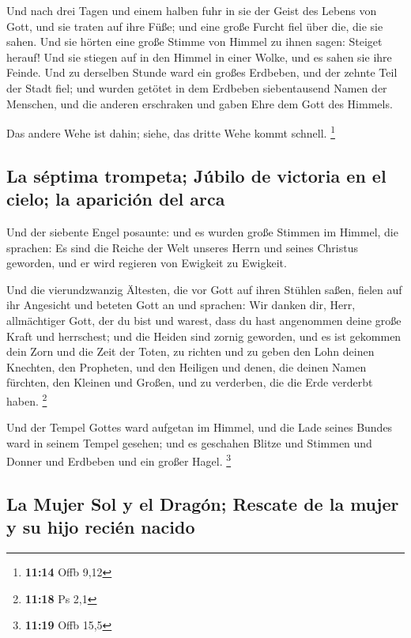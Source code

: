 Und nach drei Tagen und einem halben fuhr in sie der
Geist des Lebens von Gott, und sie traten auf ihre Füße; und eine große
Furcht fiel über die, die sie sahen.  Und sie hörten eine
große Stimme von Himmel zu ihnen sagen: Steiget herauf! Und sie stiegen
auf in den Himmel in einer Wolke, und es sahen sie ihre Feinde.
 Und zu derselben Stunde ward ein großes Erdbeben, und
der zehnte Teil der Stadt fiel; und wurden getötet in dem Erdbeben
siebentausend Namen der Menschen, und die anderen erschraken und gaben
Ehre dem Gott des Himmels.

 Das andere Wehe ist dahin; siehe, das dritte Wehe kommt
schnell. \footnote{\textbf{11:14} Offb 9,12}

\hypertarget{la-suxe9ptima-trompeta-juxfabilo-de-victoria-en-el-cielo-la-apariciuxf3n-del-arca}{%
\subsection{La séptima trompeta; Júbilo de victoria en el cielo; la
aparición del
arca}\label{la-suxe9ptima-trompeta-juxfabilo-de-victoria-en-el-cielo-la-apariciuxf3n-del-arca}}

 Und der siebente Engel posaunte: und es wurden große
Stimmen im Himmel, die sprachen: Es sind die Reiche der Welt unseres
Herrn und seines Christus geworden, und er wird regieren von Ewigkeit zu
Ewigkeit.

 Und die vierundzwanzig Ältesten, die vor Gott auf ihren
Stühlen saßen, fielen auf ihr Angesicht und beteten Gott an
 und sprachen: Wir danken dir, Herr, allmächtiger Gott,
der du bist und warest, dass du hast angenommen deine große Kraft und
herrschest;  und die Heiden sind zornig geworden, und es
ist gekommen dein Zorn und die Zeit der Toten, zu richten und zu geben
den Lohn deinen Knechten, den Propheten, und den Heiligen und denen, die
deinen Namen fürchten, den Kleinen und Großen, und zu verderben, die die
Erde verderbt haben. \footnote{\textbf{11:18} Ps 2,1}

 Und der Tempel Gottes ward aufgetan im Himmel, und die
Lade seines Bundes ward in seinem Tempel gesehen; und es geschahen
Blitze und Stimmen und Donner und Erdbeben und ein großer Hagel.
\footnote{\textbf{11:19} Offb 15,5}

\hypertarget{la-mujer-sol-y-el-draguxf3n-rescate-de-la-mujer-y-su-hijo-reciuxe9n-nacido}{%
\subsection{La Mujer Sol y el Dragón; Rescate de la mujer y su hijo
recién
nacido}\label{la-mujer-sol-y-el-draguxf3n-rescate-de-la-mujer-y-su-hijo-reciuxe9n-nacido}}


